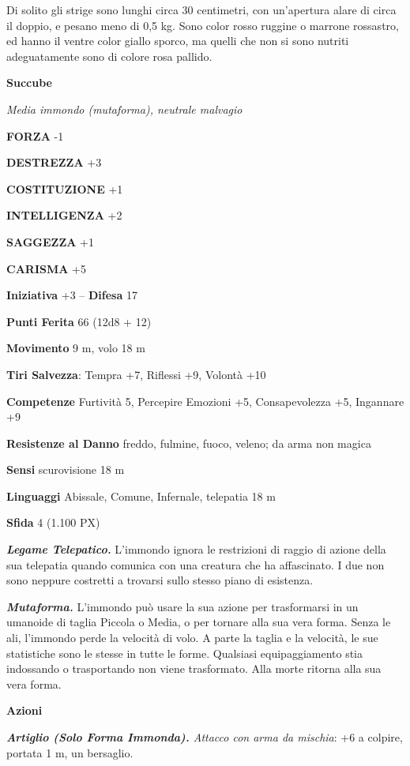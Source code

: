 \begin{multicols}{2}
Di solito gli strige sono lunghi circa 30 centimetri, con un'apertura alare di circa il doppio, e pesano meno di 0,5 kg. Sono color rosso ruggine o marrone rossastro, ed hanno il ventre color giallo sporco, ma quelli che non si sono nutriti adeguatamente sono di colore rosa pallido.

\medskip{}\textbf{Succube}

\textit{Media immondo (mutaforma), neutrale malvagio}

\textbf{FORZA} -1

\textbf{DESTREZZA} +3

\textbf{COSTITUZIONE} +1

\textbf{INTELLIGENZA} +2

\textbf{SAGGEZZA} +1

\textbf{CARISMA} +5

\textbf{Iniziativa} +3 -- \textbf{Difesa} 17

\textbf{Punti Ferita} 66 (12d8 + 12)

\textbf{Movimento} 9 m, volo 18 m

\textbf{Tiri Salvezza}: Tempra +7, Riflessi +9, Volontà +10

\textbf{Competenze} Furtività 5, Percepire Emozioni +5, Consapevolezza +5, Ingannare +9

\textbf{Resistenze al Danno} freddo, fulmine, fuoco, veleno; da arma non magica

\textbf{Sensi} scurovisione 18 m

\textbf{Linguaggi} Abissale, Comune, Infernale, telepatia 18 m

\textbf{Sfida} 4 (1.100 PX)

\textit{\textbf{Legame Telepatico.}} L'immondo ignora le restrizioni di raggio di azione della sua telepatia quando comunica con una creatura che ha affascinato. I due non sono neppure costretti a trovarsi sullo stesso piano di esistenza.

\textit{\textbf{Mutaforma.}} L'immondo può usare la sua azione per trasformarsi in un umanoide di taglia Piccola o Media, o per tornare alla sua vera forma. Senza le ali, l'immondo perde la velocità di volo. A parte la taglia e la velocità, le sue statistiche sono le stesse in tutte le forme. Qualsiasi equipaggiamento stia indossando o trasportando non viene trasformato. Alla morte ritorna alla sua vera forma.

\textbf{Azioni}

\textit{\textbf{Artiglio (Solo Forma Immonda).} Attacco con arma da mischia}: +6 a colpire, portata 1 m, un bersaglio.


\end{multicols}
